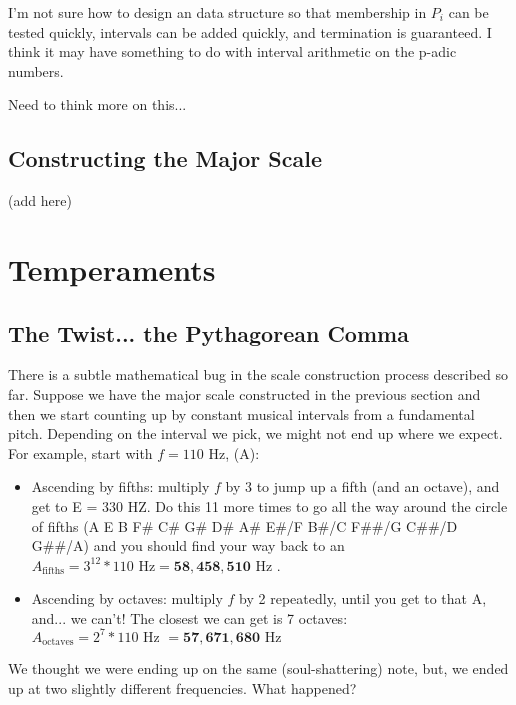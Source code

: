 \documentclass[letterpaper]{article}
\theoremstyle{definition}
\begin{document}
{I'm not sure how to design an data structure so that membership in $P_i$ can be tested quickly, intervals can be added quickly, and termination is guaranteed.  I think it may have something to do with interval arithmetic on the p-adic numbers. 

Need to think more on this...

\subsection{Constructing the Major Scale}
(add here)












\section{Temperaments}
\subsection{The Twist... the Pythagorean Comma}

There is a subtle mathematical bug in the scale construction process described so far.  Suppose we have the major scale constructed in the previous section and then we start counting up by constant musical intervals from a fundamental pitch.  Depending on the interval we pick, we might not end up where we expect.  For example, start with $f=110$ Hz, (A):
\begin{itemize}
\item Ascending by fifths:  multiply $f$ by 3 to jump up a fifth (and an octave), and get to E = 330 HZ.  Do this 11 more times to go all the way around the circle of fifths (A E B F\# C\# G\# D\# A\# E\#/F B\#/C F\#\#/G C\#\#/D G\#\#/A) and you should find your way back to an $A_{\textrm{fifths}} = 3^{12} * 110  \textrm{ Hz} = \bm{58,458,510} \textrm{ Hz }$.

\item Ascending by octaves: multiply $f$ by 2 repeatedly, until you get to that A, and... we can't!  The closest we can get is 7 octaves:  $A_{\textrm{octaves}} = 2^7 * 110 \textrm{ Hz } = \bm{57,671,680} \textrm{ Hz }$
\end{itemize}

We thought we were ending up on the same (soul-shattering) note, but, we ended up at two slightly different frequencies.  What happened?

}
\end{document}
